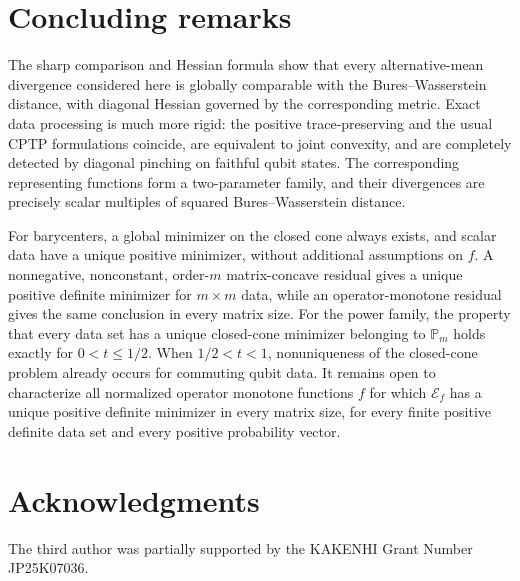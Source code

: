 \documentclass[11pt]{amsart}
\theoremstyle{definition}
\theoremstyle{remark}
\newcommand{\Pm}{\mathbb P_m}
\begin{document}
	\section{Concluding remarks}
	
	The sharp comparison and Hessian formula show that every alternative-mean
	divergence considered here is globally comparable with the Bures--Wasserstein distance, with diagonal
	Hessian governed by the corresponding metric. Exact data processing is much more rigid: the positive trace-preserving
	and the usual CPTP formulations coincide, are equivalent to joint
	convexity, and are completely detected by diagonal pinching on faithful
	qubit states.  The corresponding representing functions form a
	two-parameter family, and their divergences are precisely scalar multiples
	of squared Bures--Wasserstein distance.
	
For barycenters, a global minimizer on the closed cone always exists, and
scalar data have a unique positive minimizer, without additional assumptions
on $f$.  A nonnegative, nonconstant, order-$m$ matrix-concave residual
gives a unique positive definite minimizer for $m\times m$ data, while an
operator-monotone residual gives the same conclusion in every matrix size.
For the power family, the property that every data set has a unique
closed-cone minimizer belonging to $\Pm$ holds exactly for
$0<t\le1/2$.  When $1/2<t<1$, nonuniqueness of the closed-cone problem
already occurs for commuting qubit data.  It remains open to characterize all normalized operator monotone functions
$f$ for which $\mathcal E_f$ has a unique positive definite minimizer
in every matrix size, for every finite positive definite data set and every
positive probability vector.


\section*{Acknowledgments}
The third author was partially supported by the KAKENHI Grant Number JP25K07036.
	
\end{document}
